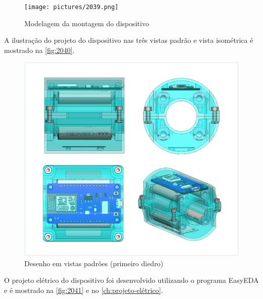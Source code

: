 \begin{figure}[H]
	\caption{\label{fig:2039} Modelagem da montagem do dispositivo}
	\begin{center}
		\texttt{[image: pictures/2039.png]}
	\end{center}
\end{figure}

A ilustração do projeto do dispositivo nas três vistas padrão e vista isométrica é mostrado na \autoref{fig:2040}.

\begin{figure}[H]
	\caption{\label{fig:2040} Desenho em vistas padrões (primeiro diedro)}
	\begin{center}
		\includegraphics[width=\textwidth]{pictures/2040.png}
	\end{center}
\end{figure}

O projeto elétrico do dispositivo foi desenvolvido utilizando o programa EasyEDA e é mostrado na \autoref{fig:2041} e no \autoref{ch:projeto-elétrico}.

